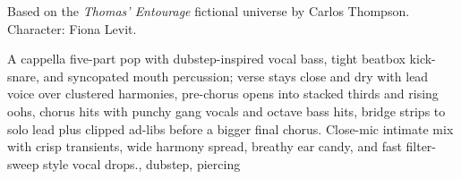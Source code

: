 

\begin{notes}
Based on the \emph{Thomas’ Entourage} fictional universe by Carlos Thompson.\\
Character: Fiona Levit.\\
\end{notes}

\begin{style}
A cappella five-part pop with dubstep-inspired vocal bass, tight beatbox kick-snare, and syncopated mouth percussion; verse stays close and dry with lead voice over clustered harmonies, pre-chorus opens into stacked thirds and rising oohs, chorus hits with punchy gang vocals and octave bass hits, bridge strips to solo lead plus clipped ad-libs before a bigger final chorus. %
Close-mic intimate mix with crisp transients, wide harmony spread, breathy ear candy, and fast filter-sweep style vocal drops., dubstep, piercing
\end{style}

